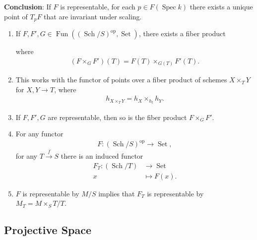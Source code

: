 \textbf{Conclusion}: If \(F\) is representable, for each
\(p\in F(\operatorname{Spec}k)\) there exists a unique point of
\(T_p F\) that are invariant under scaling.

\begin{enumerate}
\def\labelenumi{\arabic{enumi}.}
\item
  If
  \(F, F', G \in {\operatorname{Fun}}( ({\operatorname{Sch}}/S)^\operatorname{op}, {\operatorname{Set}})\),
  there exists a fiber product

  \begin{center}
   \end{center}

  where
  \begin{align*}
   (F \times_G F')(T) = F(T) \times_{G(T)} F'(T)
   .\end{align*}
\item
  This works with the functor of points over a fiber product of schemes
  \(X \times_T Y\) for \(X, Y \to T\), where
  \begin{align*}
   h_{X \times_T Y}= h_X \times_{h_t} h_Y
   .\end{align*}
\item
  If \(F, F', G\) are representable, then so is the fiber product
  \(F \times_G F'\).
\item
  For any functor
  \begin{align*}
   F: ({\operatorname{Sch}}/S)^\operatorname{op}\to {\operatorname{Set}}
   ,\end{align*}
  for any \(T \xrightarrow{f} S\) there is an induced functor
  \begin{align*}          F_T: ({\operatorname{Sch}}/T) &\to {\operatorname{Set}}\\           x &\mapsto F(x)      .\end{align*}
\item
  \(F\) is representable by \(M/S\) implies that \(F_T\) is
  representable by \(M_T = M \times_S T / T\).
\end{enumerate}

\hypertarget{projective-space}{%
\subsection{Projective Space}\label{projective-space}}

